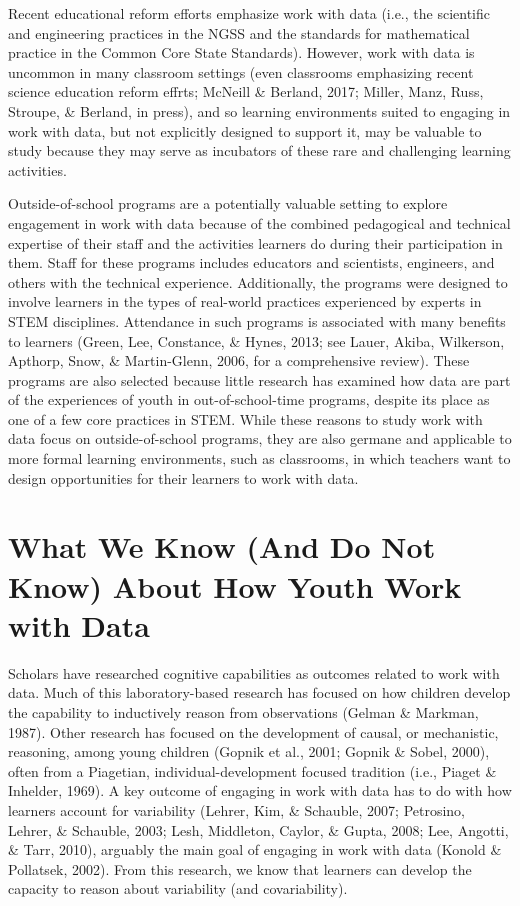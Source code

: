 \documentclass[]{msu-thesis}
\theoremstyle{definition}
\theoremstyle{definition}
\theoremstyle{definition}
\theoremstyle{remark}
\begin{document}
Recent educational reform efforts emphasize work with data (i.e., the
scientific and engineering practices in the NGSS and the standards for
mathematical practice in the Common Core State Standards). However, work
with data is uncommon in many classroom settings (even classrooms
emphasizing recent science education reform effrts; McNeill \& Berland,
2017; Miller, Manz, Russ, Stroupe, \& Berland, in press), and so
learning environments suited to engaging in work with data, but not
explicitly designed to support it, may be valuable to study because they
may serve as incubators of these rare and challenging learning
activities.

Outside-of-school programs are a potentially valuable setting to explore
engagement in work with data because of the combined pedagogical and
technical expertise of their staff and the activities learners do during
their participation in them. Staff for these programs includes educators
and scientists, engineers, and others with the technical experience.
Additionally, the programs were designed to involve learners in the
types of real-world practices experienced by experts in STEM
disciplines. Attendance in such programs is associated with many
benefits to learners (Green, Lee, Constance, \& Hynes, 2013; see Lauer,
Akiba, Wilkerson, Apthorp, Snow, \& Martin-Glenn, 2006, for a
comprehensive review). These programs are also selected because little
research has examined how data are part of the experiences of youth in
out-of-school-time programs, despite its place as one of a few core
practices in STEM. While these reasons to study work with data focus on
outside-of-school programs, they are also germane and applicable to more
formal learning environments, such as classrooms, in which teachers want
to design opportunities for their learners to work with data.

\section{What We Know (And Do Not Know) About How Youth Work with
Data}\label{what-we-know-and-do-not-know-about-how-youth-work-with-data}

Scholars have researched cognitive capabilities as outcomes related to
work with data. Much of this laboratory-based research has focused on
how children develop the capability to inductively reason from
observations (Gelman \& Markman, 1987). Other research has focused on
the development of causal, or mechanistic, reasoning, among young
children (Gopnik et al., 2001; Gopnik \& Sobel, 2000), often from a
Piagetian, individual-development focused tradition (i.e., Piaget \&
Inhelder, 1969). A key outcome of engaging in work with data has to do
with how learners account for variability (Lehrer, Kim, \& Schauble,
2007; Petrosino, Lehrer, \& Schauble, 2003; Lesh, Middleton, Caylor, \&
Gupta, 2008; Lee, Angotti, \& Tarr, 2010), arguably the main goal of
engaging in work with data (Konold \& Pollatsek, 2002). From this
research, we know that learners can develop the capacity to reason about
variability (and covariability).
\end{document}
